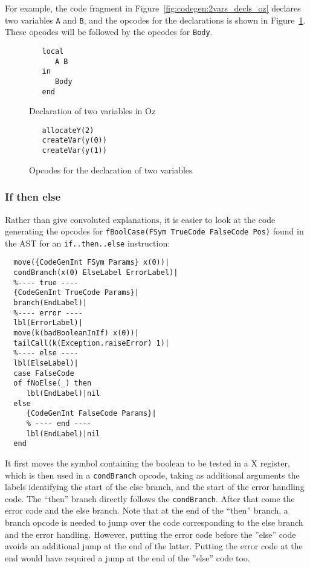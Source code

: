 \documentclass[a4paper]{memoir}
\begin{document}
For example, the code fragment in Figure~\ref{fig:codegen:2vars_decls_oz} declares two variables \lstinline!A! and
\lstinline!B!, and the opcodes for the declarations is shown in
Figure~\ref{fig:codegen:2vars_decls_opcode}. These opcodes will be followed by
the opcodes for \lstinline!Body!.  
\begin{figure}[h]
\begin{lstlisting}
   local
      A B
   in
      Body
   end
\end{lstlisting}
\caption{Declaration of two variables in Oz}
\label{fig:codegen:2vars_decls_oz}
\begin{lstlisting}
   allocateY(2)
   createVar(y(0))
   createVar(y(1))
\end{lstlisting}
\caption{Opcodes for the declaration of two variables}
\label{fig:codegen:2vars_decls_opcode}
\end{figure}




\subsubsection{If then else}
Rather than give convoluted explanations, it is easier to look at the code generating the opcodes for \lstinline!fBoolCase(FSym TrueCode FalseCode Pos)! found in the AST for an \lstinline!if..then..else! instruction:
\begin{lstlisting}
  move({CodeGenInt FSym Params} x(0))|
  condBranch(x(0) ElseLabel ErrorLabel)|
  %---- true ----
  {CodeGenInt TrueCode Params}|
  branch(EndLabel)|
  %---- error ----
  lbl(ErrorLabel)|
  move(k(badBooleanInIf) x(0))|
  tailCall(k(Exception.raiseError) 1)|
  %---- else ----
  lbl(ElseLabel)|
  case FalseCode
  of fNoElse(_) then
     lbl(EndLabel)|nil
  else
     {CodeGenInt FalseCode Params}|
     % ---- end ----
     lbl(EndLabel)|nil
  end
\end{lstlisting}
It first moves the symbol containing the boolean to be tested in a X register,
which is then used in a \lstinline!condBranch! opcode, taking as additional
arguments the labels identifying the start of the else branch, and the start of
the error handling code. The ``then'' branch directly follows the
\lstinline!condBranch!. After that come the error code and the else branch. Note
that at the end of the ``then'' branch, a branch opcode is needed to jump over
the code corresponding to the else branch and the error handling. However,
putting the error code before the ''else'' code avoids an additional jump at the
end of the latter. Putting the error code at the end would have required a jump
at the end of the ''else'' code too.
\end{document}
